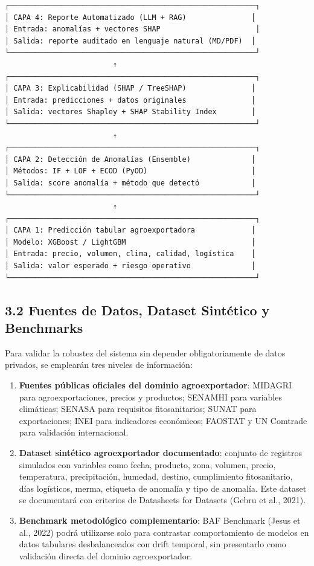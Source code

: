 \begin{verbatim}
┌─────────────────────────────────────────────────────────┐
│ CAPA 4: Reporte Automatizado (LLM + RAG)               │
│ Entrada: anomalías + vectores SHAP                      │
│ Salida: reporte auditado en lenguaje natural (MD/PDF)  │
└─────────────────────────────────────────────────────────┘
                         ↑
┌─────────────────────────────────────────────────────────┐
│ CAPA 3: Explicabilidad (SHAP / TreeSHAP)               │
│ Entrada: predicciones + datos originales               │
│ Salida: vectores Shapley + SHAP Stability Index        │
└─────────────────────────────────────────────────────────┘
                         ↑
┌─────────────────────────────────────────────────────────┐
│ CAPA 2: Detección de Anomalías (Ensemble)              │
│ Métodos: IF + LOF + ECOD (PyOD)                        │
│ Salida: score anomalía + método que detectó            │
└─────────────────────────────────────────────────────────┘
                         ↑
┌─────────────────────────────────────────────────────────┐
│ CAPA 1: Predicción tabular agroexportadora             │
│ Modelo: XGBoost / LightGBM                             │
│ Entrada: precio, volumen, clima, calidad, logística    │
│ Salida: valor esperado + riesgo operativo              │
└─────────────────────────────────────────────────────────┘
\end{verbatim}

\subsection{3.2 Fuentes de Datos, Dataset Sintético y
Benchmarks}\label{fuentes-de-datos-dataset-sintuxe9tico-y-benchmarks}

Para validar la robustez del sistema sin depender obligatoriamente de
datos privados, se emplearán tres niveles de información:

\begin{enumerate}
\def\labelenumi{\arabic{enumi}.}
\tightlist
\item
  \textbf{Fuentes públicas oficiales del dominio agroexportador}:
  MIDAGRI para agroexportaciones, precios y productos; SENAMHI para
  variables climáticas; SENASA para requisitos fitosanitarios; SUNAT
  para exportaciones; INEI para indicadores económicos; FAOSTAT y UN
  Comtrade para validación internacional.
\item
  \textbf{Dataset sintético agroexportador documentado}: conjunto de
  registros simulados con variables como fecha, producto, zona, volumen,
  precio, temperatura, precipitación, humedad, destino, cumplimiento
  fitosanitario, días logísticos, merma, etiqueta de anomalía y tipo de
  anomalía. Este dataset se documentará con criterios de Datasheets for
  Datasets (Gebru et al., 2021).
\item
  \textbf{Benchmark metodológico complementario}: BAF Benchmark (Jesus
  et al., 2022) podrá utilizarse solo para contrastar comportamiento de
  modelos en datos tabulares desbalanceados con drift temporal, sin
  presentarlo como validación directa del dominio agroexportador.
\end{enumerate}

